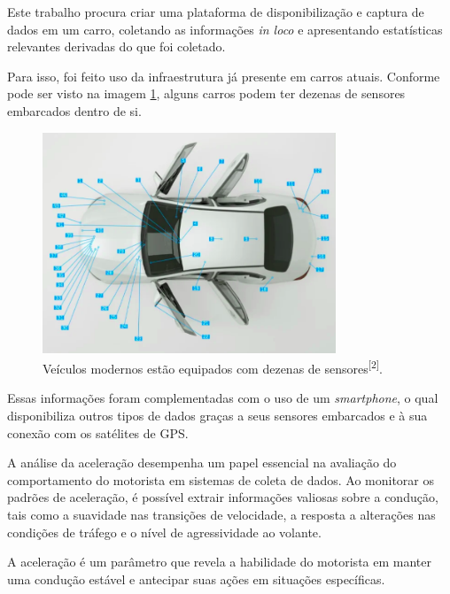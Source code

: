 Este trabalho procura criar uma plataforma de disponibilização e captura de dados em um carro, coletando as informações \textit{in loco} e apresentando estatísticas relevantes derivadas do que foi coletado.

Para isso, foi feito uso da infraestrutura já presente em carros atuais. Conforme pode ser visto na imagem \ref{fig:sensors_car}, alguns carros podem ter dezenas de sensores embarcados dentro de si.


\begin{figure}[hp]
    \centering
    
    \includegraphics[]{figures/sensores_carro.png}
    
    \caption{Veículos modernos estão equipados com dezenas de sensores\textsuperscript{[2]}.}
    
    \label{fig:sensors_car}
\end{figure}

Essas informações foram complementadas com o uso de um \textit{smartphone}, o qual disponibiliza outros tipos de dados graças a seus sensores embarcados e à sua conexão com os satélites de GPS.

A análise da aceleração desempenha um papel essencial na avaliação do comportamento do motorista em sistemas de coleta de dados. Ao monitorar os padrões de aceleração, é possível extrair informações valiosas sobre a condução, tais como a suavidade nas transições de velocidade, a resposta a alterações nas condições de tráfego e o nível de agressividade ao volante.

A aceleração é um parâmetro que revela a habilidade do motorista em manter uma condução estável e antecipar suas ações em situações específicas.


